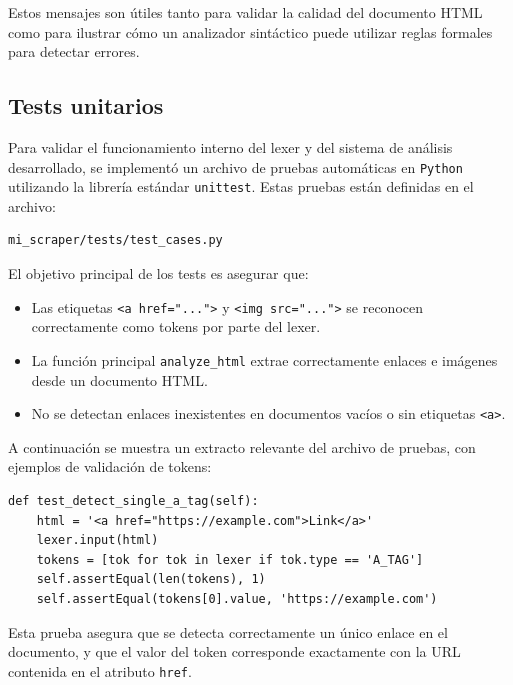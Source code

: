 \documentclass[11pt,a4paper]{article}
\begin{document}
Estos mensajes son útiles tanto para validar la calidad del documento HTML como para ilustrar cómo un analizador sintáctico puede utilizar reglas formales para detectar errores.

\subsection{Tests unitarios}

Para validar el funcionamiento interno del lexer y del sistema de análisis desarrollado, se implementó un archivo de pruebas automáticas en \texttt{Python} utilizando la librería estándar \texttt{unittest}. Estas pruebas están definidas en el archivo:

\begin{verbatim}
mi_scraper/tests/test_cases.py
\end{verbatim}

\medskip

El objetivo principal de los tests es asegurar que:

\begin{itemize}
    \item Las etiquetas \texttt{<a href="...">} y \texttt{<img src="...">} se reconocen correctamente como tokens por parte del lexer.
    \item La función principal \texttt{analyze\_html} extrae correctamente enlaces e imágenes desde un documento HTML.
    \item No se detectan enlaces inexistentes en documentos vacíos o sin etiquetas \texttt{<a>}.
\end{itemize}

A continuación se muestra un extracto relevante del archivo de pruebas, con ejemplos de validación de tokens:

\begin{verbatim}
def test_detect_single_a_tag(self):
    html = '<a href="https://example.com">Link</a>'
    lexer.input(html)
    tokens = [tok for tok in lexer if tok.type == 'A_TAG']
    self.assertEqual(len(tokens), 1)
    self.assertEqual(tokens[0].value, 'https://example.com')
\end{verbatim}

Esta prueba asegura que se detecta correctamente un único enlace en el documento, y que el valor del token corresponde exactamente con la URL contenida en el atributo \texttt{href}.

\medskip
\end{document}

